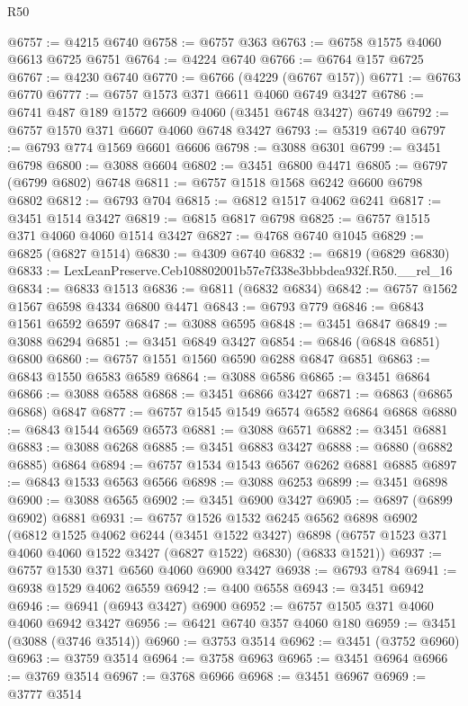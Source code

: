\begin{lexlean}{R50}
\begin{coremodule}
@6757 := @4215 @6740
@6758 := @6757 @363
@6763 := @6758 @1575 @4060 @6613 @6725 @6751
@6764 := @4224 @6740
@6766 := @6764 @157 @6725
@6767 := @4230 @6740
@6770 := @6766 (@4229 (@6767 @157))
@6771 := @6763 @6770
@6777 := @6757 @1573 @371 @6611 @4060 @6749 @3427
@6786 := @6741 @487 @189 @1572 @6609 @4060 (@3451 @6748 @3427) @6749
@6792 := @6757 @1570 @371 @6607 @4060 @6748 @3427
@6793 := @5319 @6740
@6797 := @6793 @774 @1569 @6601 @6606
@6798 := @3088 @6301
@6799 := @3451 @6798
@6800 := @3088 @6604
@6802 := @3451 @6800 @4471
@6805 := @6797 (@6799 @6802) @6748
@6811 := @6757 @1518 @1568 @6242 @6600 @6798 @6802
@6812 := @6793 @704
@6815 := @6812 @1517 @4062 @6241
@6817 := @3451 @1514 @3427
@6819 := @6815 @6817 @6798
@6825 := @6757 @1515 @371 @4060 @4060 @1514 @3427
@6827 := @4768 @6740 @1045
@6829 := @6825 (@6827 @1514)
@6830 := @4309 @6740
@6832 := @6819 (@6829 @6830)
@6833 := LexLeanPreserve.Ceb108802001b57e7f338e3bbbdea932f.R50.__rel_16
@6834 := @6833 @1513
@6836 := @6811 (@6832 @6834)
@6842 := @6757 @1562 @1567 @6598 @4334 @6800 @4471
@6843 := @6793 @779
@6846 := @6843 @1561 @6592 @6597
@6847 := @3088 @6595
@6848 := @3451 @6847
@6849 := @3088 @6294
@6851 := @3451 @6849 @3427
@6854 := @6846 (@6848 @6851) @6800
@6860 := @6757 @1551 @1560 @6590 @6288 @6847 @6851
@6863 := @6843 @1550 @6583 @6589
@6864 := @3088 @6586
@6865 := @3451 @6864
@6866 := @3088 @6588
@6868 := @3451 @6866 @3427
@6871 := @6863 (@6865 @6868) @6847
@6877 := @6757 @1545 @1549 @6574 @6582 @6864 @6868
@6880 := @6843 @1544 @6569 @6573
@6881 := @3088 @6571
@6882 := @3451 @6881
@6883 := @3088 @6268
@6885 := @3451 @6883 @3427
@6888 := @6880 (@6882 @6885) @6864
@6894 := @6757 @1534 @1543 @6567 @6262 @6881 @6885
@6897 := @6843 @1533 @6563 @6566
@6898 := @3088 @6253
@6899 := @3451 @6898
@6900 := @3088 @6565
@6902 := @3451 @6900 @3427
@6905 := @6897 (@6899 @6902) @6881
@6931 := @6757
    @1526
    @1532
    @6245
    @6562
    @6898
    @6902
    (@6812
      @1525
      @4062
      @6244
      (@3451 @1522 @3427)
      @6898
      (@6757 @1523 @371 @4060 @4060 @1522 @3427 (@6827 @1522) @6830)
      (@6833 @1521))
@6937 := @6757 @1530 @371 @6560 @4060 @6900 @3427
@6938 := @6793 @784
@6941 := @6938 @1529 @4062 @6559
@6942 := @400 @6558
@6943 := @3451 @6942
@6946 := @6941 (@6943 @3427) @6900
@6952 := @6757 @1505 @371 @4060 @4060 @6942 @3427
@6956 := @6421 @6740 @357 @4060 @180
@6959 := @3451 (@3088 (@3746 @3514))
@6960 := @3753 @3514
@6962 := @3451 (@3752 @6960)
@6963 := @3759 @3514
@6964 := @3758 @6963
@6965 := @3451 @6964
@6966 := @3769 @3514
@6967 := @3768 @6966
@6968 := @3451 @6967
@6969 := @3777 @3514

\end{coremodule}
\end{lexlean}
